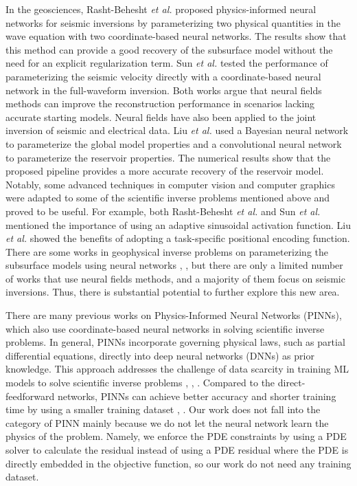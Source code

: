 \documentclass[lettersize,journal]{IEEEtran}
\begin{document}
In the geosciences, Rasht-Behesht \textit{et al.} \cite{https://doi.org/10.1029/2021JB023120} proposed physics-informed neural networks for seismic inversions by parameterizing two physical quantities in the wave equation with two coordinate-based neural networks. The results show that this method can provide a good recovery of the subsurface model without the need for an explicit regularization term. Sun \textit{et al.} \cite{IFWI} tested the performance of parameterizing the seismic velocity directly with a coordinate-based neural network in the full-waveform inversion. Both works argue that neural fields methods can improve the reconstruction performance in scenarios lacking accurate starting models. Neural fields have also been applied to the joint inversion of seismic and electrical data. 
Liu \textit{et al.} \cite{Mingliang} used a Bayesian neural network to parameterize the global model properties and a convolutional neural network to parameterize the reservoir properties. 
The numerical results show that the proposed pipeline provides a more accurate recovery of the reservoir model. Notably, some advanced techniques in computer vision and computer graphics were adapted to some of the scientific inverse problems mentioned above and proved to be useful. For example, both Rasht-Behesht \textit{et al.} \cite{https://doi.org/10.1029/2021JB023120} and Sun \textit{et al.} \cite{IFWI} mentioned the importance of using an adaptive sinusoidal activation function. Liu \textit{et al.} \cite{liu2022recoverycontinuous3drefractive} showed the benefits of adopting a task-specific positional encoding function. There are some works in geophysical inverse problems on parameterizing the subsurface models using neural networks \cite{https://doi.org/10.1029/2025JH000621}, \cite{https://doi.org/10.1029/2024JH000542}, but there are only a limited number of works that use neural fields methods, and a majority of them focus on seismic inversions. Thus, there is substantial potential to further explore this new area.

There are many previous works on Physics-Informed Neural Networks (PINNs), which also use coordinate-based neural networks in solving scientific inverse problems. In general, PINNs incorporate governing physical laws, such as partial differential equations, directly into deep neural networks (DNNs) as prior knowledge. This approach addresses the challenge of data scarcity in training ML models to solve scientific inverse problems \cite{https://doi.org/10.1029/2020JB020549}, \cite{https://doi.org/10.1029/2019WR026731}, \cite{gmd-16-7375-2023}. Compared to the direct-feedforward networks, PINNs can achieve better accuracy and shorter training time by using a smaller training dataset \cite{RAISSI2019686}, \cite{cite-key}. Our work does not fall into the category of PINN mainly because we do not let the neural network learn the physics of the problem. Namely, we enforce the PDE constraints by using a PDE solver to calculate the residual instead of using a PDE residual where the PDE is directly embedded in the objective function, so our work do not need any training dataset.  
\end{document}
